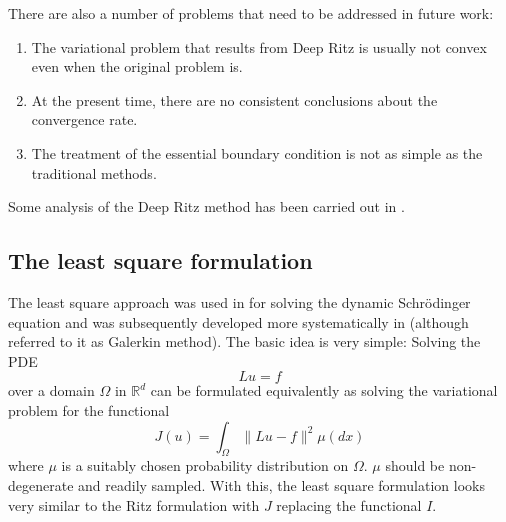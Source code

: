 \documentclass[12pt,AutoFakeBold,AutoFakeSlant]{article}
\theoremstyle{definition}
\newcommand{\R}{\mathbb{R}}
\newcommand{\bx}{{x}}
\newcommand{\be}{\begin{equation}}
\newcommand{\ee}{\end{equation}}
\begin{document}
	There are also a number of problems that need to be addressed in future work:
	\begin{enumerate}
	\item  The variational problem that results from Deep Ritz is usually not
	convex even when the original problem is.
	\item At the present time, there are no consistent conclusions about the
	convergence rate.
	\item The treatment of the essential boundary condition
	is not as simple as the traditional methods.
	\end{enumerate}
	Some analysis of the  Deep Ritz method has been carried out in \cite{muller2019deep}.
	\subsection{The least square formulation}
	The least square approach was used in \cite{carleo2017solving} for solving the
	dynamic Schr\"odinger equation and was subsequently developed more systematically
	in \cite{Sirignano2018dgm} (although \cite{Sirignano2018dgm} referred to it as Galerkin method).
	The basic idea is very simple: Solving the PDE
	\be
	Lu = f
	\label{PDE-1}
	\ee
	over a domain $\Omega$ in $\R^d$ can be formulated equivalently as solving the
	variational problem for the functional
	\be
	J(u) = \int_{\Omega} \| Lu - f \|^2 \mu(d \bx)
	\ee
	where $\mu$ is a suitably chosen probability distribution on $\Omega$.
	$\mu$ should be non-degenerate and readily sampled.
	With this,  the least square formulation looks very similar to the Ritz formulation with $J$ replacing
	the functional $I$.
\end{document}
